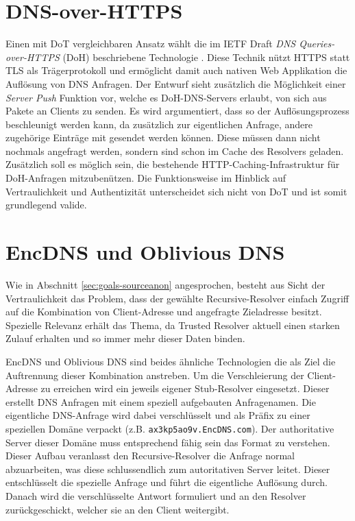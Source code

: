 \section{DNS-over-HTTPS}
Einen mit DoT vergleichbaren Ansatz wählt die im IETF Draft \textit{DNS Queries-over-HTTPS} (DoH) beschriebene Technologie \cite{Mcmanus2018}. Diese Technik nützt HTTPS statt TLS als Trägerprotokoll und ermöglicht damit auch nativen Web Applikation die Auflösung von DNS Anfragen. Der Entwurf sieht zusätzlich die Möglichkeit einer \textit{Server Push} Funktion vor, welche es DoH-DNS-Servers erlaubt, von sich aus Pakete an Clients zu senden. Es wird argumentiert, dass so der Auflösungsprozess beschleunigt werden kann, da zusätzlich zur eigentlichen Anfrage, andere zugehörige Einträge mit gesendet werden können. Diese müssen dann nicht nochmals angefragt werden, sondern sind schon im Cache des Resolvers geladen. Zusätzlich soll es möglich sein, die bestehende HTTP-Caching-Infrastruktur für DoH-Anfragen mitzubenützen. Die Funktionsweise im Hinblick auf Vertraulichkeit und Authentizität unterscheidet sich nicht von DoT und ist somit grundlegend valide. 

\section{EncDNS und Oblivious DNS}
\label{tec:encdns-odns}
Wie in Abschnitt \ref{sec:goals-sourceanon} angesprochen, besteht aus Sicht der Vertraulichkeit das Problem, dass der gewählte Recursive-Resolver einfach Zugriff auf die Kombination von Client-Adresse und angefragte Zieladresse besitzt. Spezielle Relevanz erhält das Thema, da Trusted Resolver aktuell einen starken Zulauf erhalten und so immer mehr dieser Daten binden.

EncDNS\cite{Herrmann2014} und Oblivious DNS\cite{Schmitt2018} sind beides ähnliche Technologien die als Ziel die Auftrennung dieser Kombination anstreben. Um die Verschleierung der Client-Adresse zu erreichen wird ein jeweils eigener Stub-Resolver eingesetzt. Dieser erstellt DNS Anfragen mit einem speziell aufgebauten Anfragenamen. Die eigentliche DNS-Anfrage wird dabei verschlüsselt und als Präfix zu einer speziellen Domäne verpackt (z.B. \texttt{ax3kp5ao9v.EncDNS.com}). Der authoritative Server dieser Domäne muss entsprechend fähig sein das Format zu verstehen. Dieser Aufbau veranlasst den Recursive-Resolver die Anfrage normal abzuarbeiten, was diese schlussendlich zum autoritativen Server leitet. Dieser entschlüsselt die spezielle Anfrage und führt die eigentliche Auflösung durch. Danach wird die verschlüsselte Antwort formuliert und an den Resolver zurückgeschickt, welcher sie an den Client weitergibt.

